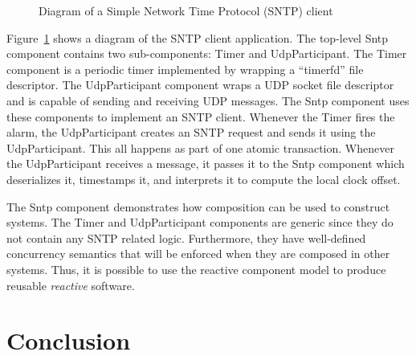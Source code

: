 \begin{figure}
\centering
{}%
\caption{Diagram of a Simple Network Time Protocol (SNTP) client\label{sntp}}
\end{figure}

Figure~\ref{sntp} shows a diagram of the SNTP client application.
The top-level Sntp component contains two sub-components:  Timer and UdpParticipant.
The Timer component is a periodic timer implemented by wrapping a ``timerfd'' file descriptor.
The UdpParticipant component wraps a UDP socket file descriptor and is capable of sending and receiving UDP messages.
The Sntp component uses these components to implement an SNTP client.
Whenever the Timer fires the alarm, the UdpParticipant creates an SNTP request and sends it using the UdpParticipant.
This all happens as part of one atomic transaction.
Whenever the UdpParticipant receives a message, it passes it to the Sntp component which deserializes it, timestamps it, and interprets it to compute the local clock offset.

The Sntp component demonstrates how composition can be used to construct systems.
The Timer and UdpParticipant components are generic since they do not contain any SNTP related logic.
Furthermore, they have well-defined concurrency semantics that will be enforced when they are composed in other systems.
Thus, it is possible to use the reactive component model to produce reusable \emph{reactive} software.

\section{Conclusion}

